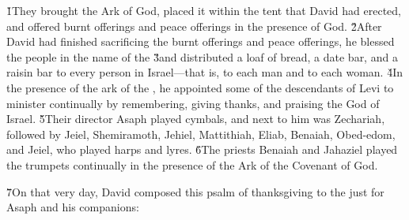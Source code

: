 \v{1}They brought the Ark of God, placed it within the tent that David had erected, and offered burnt offerings and peace offerings in the presence of God. \v{2}After David had finished sacrificing the burnt offerings and peace offerings, he blessed the people in the name of the  \v{3}and distributed a loaf of bread, a date bar, and a raisin bar to every person in Israel---that is, to each man and to each woman. \v{4}In the presence of the ark of the , he appointed some of the descendants of Levi to minister continually by remembering, giving thanks, and praising the  God of Israel. \v{5}Their director Asaph played cymbals, and next to him was Zechariah, followed by Jeiel, Shemiramoth, Jehiel, Mattithiah, Eliab, Benaiah, Obed-edom, and Jeiel, who played harps and lyres. \v{6}The priests Benaiah and Jahaziel played the trumpets continually in the presence of the Ark of the Covenant of God.

\v{7}On that very day, David composed this psalm of thanksgiving to the  just for Asaph and his companions:

